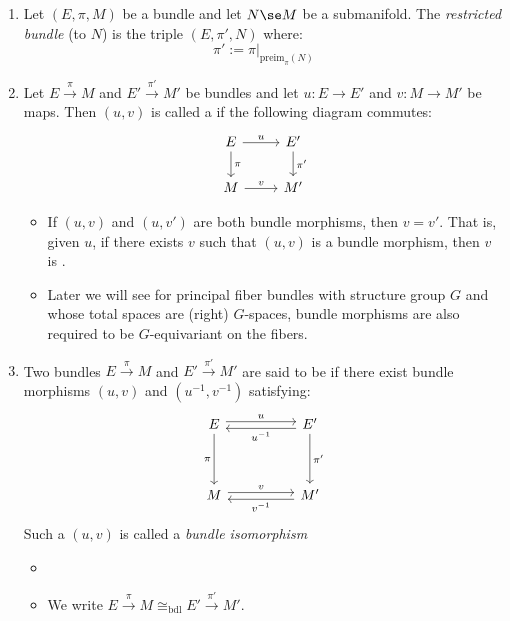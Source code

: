 \documentclass{article}
\begin{document}
\begin{enumerate}
\item {} Let $(E,\pi,M)$ be a bundle and let $N\se M$ be a submanifold. The \emph{restricted bundle} (to $N$) is the triple $(E,\pi',N)$ where:
\begin{equation*}
    \pi':=\pi|_{\mathrm{preim}_\pi(N)}
\end{equation*}
\item {}
Let $E\xrightarrow{\,\pi\,}M$ and $E'\xrightarrow{\,\pi'\,}M'$ be bundles and let $u: E\to E'$ and $v: M\to M'$ be maps. Then $(u,v)$ is called a  if the following diagram commutes:
\begin{equation*}
    \begin{tikzcd}
E \ar[r,"u"] \ar[d,"\pi"]& E' \ar[d,"\pi'"]\\
M \ar[r,"v"]& M'
\end{tikzcd}
\end{equation*}
\begin{itemize}
    \item {} If $(u,v)$ and $(u,v')$ are both bundle morphisms, then $v=v'$. That is, given $u$, if there exists $v$ such that $(u,v)$ is a bundle morphism, then $v$ is .
    \item Later we will see for principal  fiber bundles with structure group $G$ and whose total spaces are (right) $G$-spaces, bundle morphisms are also required to be $G$-equivariant on the fibers.
\end{itemize}

\item {} Two bundles $E\xrightarrow{\,\pi\,}M$ and $E'\xrightarrow{\,\pi'\,}M'$ are said to be   if there exist bundle morphisms $(u,v)$ and $(u^{-1},v^{-1})$ satisfying:
\begin{equation*}
\begin{tikzcd}
E \ar[rr,shift left,"u"] \ar[dd,"\pi"']&& E' \ar[ll,shift left,"u^{-1}"]\ar[dd,"\pi'"]\\
&&\\
M \ar[rr,shift left,"v"]&& M' \ar[ll,shift left,"v^{-1}"]
\end{tikzcd}
\end{equation*}
Such a $(u,v)$ is called a \emph{bundle isomorphism}
\begin{itemize}
    \item {}
    \item {}  We write $E\xrightarrow{\,\pi\,}M  \cong_{\mathrm{bdl}} E'\xrightarrow{\,\pi'\,}M'$.
\end{itemize}


\end{enumerate}
\end{document}

